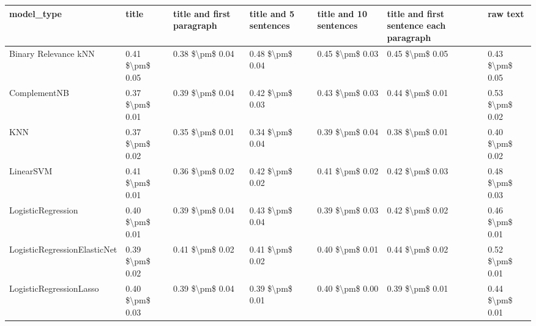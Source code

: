 \begin{tabular}{lllllll}
\toprule
                     model\_type &           title & title and first paragraph & title and 5 sentences & title and 10 sentences & title and first sentence each paragraph &            raw text \\
\midrule
           Binary Relevance kNN & 0.41 \$\textbackslash pm\$ 0.05 &           0.38 \$\textbackslash pm\$ 0.04 &       0.48 \$\textbackslash pm\$ 0.04 &        0.45 \$\textbackslash pm\$ 0.03 &                         0.45 \$\textbackslash pm\$ 0.05 &     0.43 \$\textbackslash pm\$ 0.05 \\
                   ComplementNB & 0.37 \$\textbackslash pm\$ 0.01 &           0.39 \$\textbackslash pm\$ 0.04 &       0.42 \$\textbackslash pm\$ 0.03 &        0.43 \$\textbackslash pm\$ 0.03 &                         0.44 \$\textbackslash pm\$ 0.01 &     0.53 \$\textbackslash pm\$ 0.02 \\
                            KNN & 0.37 \$\textbackslash pm\$ 0.02 &           0.35 \$\textbackslash pm\$ 0.01 &       0.34 \$\textbackslash pm\$ 0.04 &        0.39 \$\textbackslash pm\$ 0.04 &                         0.38 \$\textbackslash pm\$ 0.01 &     0.40 \$\textbackslash pm\$ 0.02 \\
                      LinearSVM & 0.41 \$\textbackslash pm\$ 0.01 &           0.36 \$\textbackslash pm\$ 0.02 &       0.42 \$\textbackslash pm\$ 0.02 &        0.41 \$\textbackslash pm\$ 0.02 &                         0.42 \$\textbackslash pm\$ 0.03 &     0.48 \$\textbackslash pm\$ 0.03 \\
             LogisticRegression & 0.40 \$\textbackslash pm\$ 0.01 &           0.39 \$\textbackslash pm\$ 0.04 &       0.43 \$\textbackslash pm\$ 0.04 &        0.39 \$\textbackslash pm\$ 0.03 &                         0.42 \$\textbackslash pm\$ 0.02 &     0.46 \$\textbackslash pm\$ 0.01 \\
   LogisticRegressionElasticNet & 0.39 \$\textbackslash pm\$ 0.02 &           0.41 \$\textbackslash pm\$ 0.02 &       0.41 \$\textbackslash pm\$ 0.02 &        0.40 \$\textbackslash pm\$ 0.01 &                         0.44 \$\textbackslash pm\$ 0.02 &     0.52 \$\textbackslash pm\$ 0.01 \\
        LogisticRegressionLasso & 0.40 \$\textbackslash pm\$ 0.03 &           0.39 \$\textbackslash pm\$ 0.04 &       0.39 \$\textbackslash pm\$ 0.01 &        0.40 \$\textbackslash pm\$ 0.00 &                         0.39 \$\textbackslash pm\$ 0.01 &     0.44 \$\textbackslash pm\$ 0.01 \\

\end{tabular}
